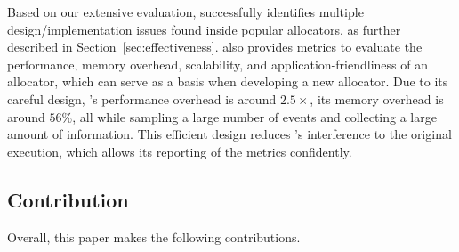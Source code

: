 
Based on our extensive evaluation, \MP{} successfully identifies multiple design/implementation issues found inside popular allocators, as further described in Section~\ref{sec:effectiveness}. \MP{} also provides metrics to evaluate the performance, memory overhead, scalability, and application-friendliness of an allocator, which can serve as a basis when developing a new allocator. Due to its careful design, \MP{}'s performance overhead is around $2.5\times$, its memory overhead is around $56\%$, all while sampling a large number of events and collecting a large amount of information. This efficient design reduces \MP{}'s interference to the original execution, which allows its reporting of the metrics confidently. 


\subsection*{Contribution}

Overall, this paper makes the following contributions. 

